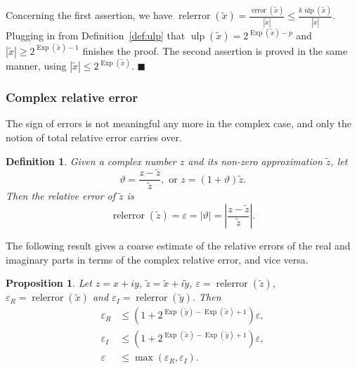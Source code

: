 \documentclass [12pt]{article}
\newcommand {\corr}[1]{{#1}}
\newcommand {\appro}[1]{\widetilde {#1}}
\newcommand {\Ulp}{{\operatorname {ulp}}}
\DeclareMathOperator{\Exp}{\operatorname {Exp}}
\newcommand{\error}{\operatorname {error}}
\newcommand{\relerror}{\operatorname {relerror}}
\renewcommand {\epsilon}{\varepsilon}
\renewcommand {\theta}{\vartheta}
\renewcommand {\leq}{\leqslant}
\renewcommand {\geq}{\geqslant}
\newtheorem{definition}[theorem]{Definition}
\newtheorem{prop}[theorem]{Proposition}
\newenvironment{proof}{\noindent{\bf Proof:}}{{\hspace* {\fill}$\blacksquare$}}
\begin{document}
\begin {proof}
Concerning the first assertion, we have
$
\relerror (\appro x) = \frac {\error (\appro x)}{|\appro x|}
\leq
\frac {k \Ulp (\appro x)}{|\appro x|}.
$
Plugging in from Definition~\ref {def:ulp} that
$\Ulp (\appro x) = 2^{\Exp (\appro x) - p}$ and
$|\appro x| \geq 2^{\Exp (\appro x) - 1}$ finishes the proof.
The second assertion is proved in the same manner, using
$|\appro x| \leq 2^{\Exp (\appro x)}$.
\end {proof}


\subsubsection {Complex relative error}
\label {sssec:comrelerror}

The sign of errors is not meaningful any more in the complex case, and
only the notion of total relative error carries over.

\begin {definition}
\label {def:comrelerror}
Given a complex number $\corr z$ and its non-zero approximation
$\appro z$, let
\[
\theta = \frac {\corr z - \appro z}{\appro z},
\text { or }
\corr z = (1 + \theta) \appro z.
\]
Then the {\em relative error} of $\appro z$ is
\[
\relerror (\appro z) = \epsilon = | \theta |
= \left| \frac {\corr z - \appro z}{\appro z} \right|.
\]
\end {definition}

The following result gives a coarse
estimate of the relative errors of the real and imaginary parts in terms of
the complex relative error, and vice versa.

\begin {prop}
\label {prop:comrelerror}
Let $\corr z = \corr x + i \corr y$, $\appro z = \appro x + i \appro y$,
$\epsilon = \relerror (\appro z)$,
$\epsilon_R = \relerror (\appro x)$ and
$\epsilon_I = \relerror (\appro y)$. Then
\begin {align*}
\epsilon_R
&\leq \left( 1 + 2^{\Exp (\appro y) - \Exp (\appro x) + 1} \right) \epsilon, \\
\epsilon_I
&\leq \left( 1 + 2^{\Exp (\appro x) - \Exp (\appro y) + 1} \right) \epsilon, \\
\epsilon
&\leq \max \left( \epsilon_R, \epsilon_I \right).
\end {align*}
\end {prop}
\end{document}
